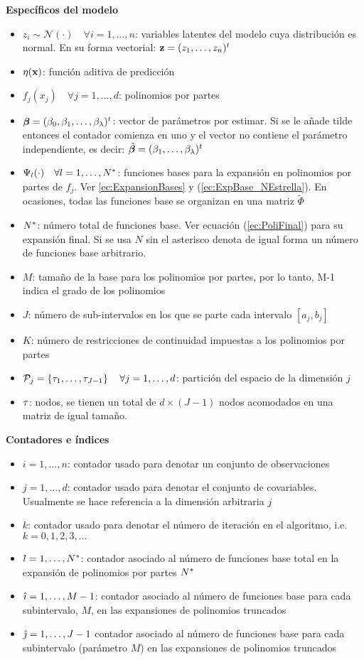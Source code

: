 \documentclass[../../Main/Main.tex]{subfiles}
\begin{document}
\textbf{Específicos del modelo}
\begin{itemize}[label={}]
	\item $z_i \sim \mathcal{N}(\cdot) \quad \forall i = 1,\ldots,n$: variables latentes del modelo cuya distribución es normal. En su forma vectorial: $\mathbf{z} = (z_1,\ldots,z_n)^t$ 
	\item $\eta(\mathbf{x})$: función aditiva de predicción
	\item $f_j(x_j) \quad \forall j = 1,\ldots,d$: polinomios por partes
	\item $\bm{\beta} = (\beta_0, \beta_1,\ldots,\beta_\lambda)^t$: vector de parámetros por estimar. Si se le añade tilde entonces el contador comienza en uno y el vector no contiene el parámetro independiente, es decir: $\tilde{\bm{\beta}} = (\beta_1,\ldots,\beta_\lambda)^t$
	\item $\Psi_l(\cdot) \quad \forall l=1,\ldots,N^*$: funciones bases para la expansión en polinomios por partes de $f_j$. Ver \eqref{ec:ExpansionBases} y (\ref{ec:ExpBase_NEstrella}). En ocasiones, todas las funciones base se organizan en una matriz $\widetilde{\Phi}$
	\item $N^*$: número total de funciones base. Ver ecuación (\ref{ec:PoliFinal}) para su expansión final. Si se usa $N$ sin el asterisco denota de igual forma un número de funciones base arbitrario.
	\item $M$: tamaño de la base para los polinomios por partes, por lo tanto, M-1 indica el grado de los polinomios
	\item $J$: número de sub-intervalos en los que se parte cada intervalo $[a_j,b_j]$
	\item $K$: número de restricciones de continuidad impuestas a los polinomios por partes
	\item $\mathcal{P}_j = \left\{\tau_1,\ldots,\tau_{J-1}\right\} \quad \forall j = 1,\ldots,d$: partición del espacio de la dimensión $j$
	\item $\tau$: nodos, se tienen un total de $d\times (J-1)$ nodos acomodados en una matriz de igual tamaño.
\end{itemize}

\textbf{Contadores e índices}
\begin{itemize}[label={}]
	\item $i = 1,\ldots,n$: contador usado para denotar un conjunto de observaciones
	\item $j = 1,\ldots,d$: contador usado para denotar el conjunto de covariables. Usualmente se hace referencia a la dimensión arbitraria $j$
	\item $k$: contador usado para denotar el número de iteración en el algoritmo, i.e. $k = 0,1,2,3,\ldots$
	\item $l = 1,\ldots,N^*$: contador asociado al número de funciones base total en la expansión de polinomios por partes $N^*$
	\item $\hat{\imath} = 1,\ldots,M-1$: contador asociado al número de funciones base para cada subintervalo, $M$, en las expansiones de polinomios truncados
	\item $\hat{\jmath} = 1,\ldots,J-1$ contador asociado al número de funciones base para cada subintervalo (parámetro $M$) en las expansiones de polinomios truncados
\end{itemize}
	
\end{document}
